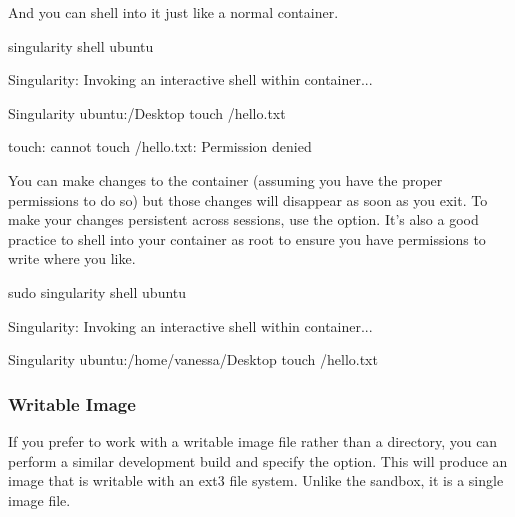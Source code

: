 \documentclass[letterpaper,10pt,english]{sphinxmanual}
\begin{document}
And you can shell into it just like a normal container.

%
\begin{sphinxVerbatim}[commandchars=\\\{\}]
\PYGZdl{} singularity shell ubuntu

Singularity: Invoking an interactive shell within container...


Singularity ubuntu:\PYGZti{}/Desktop\PYGZgt{} touch /hello.txt

touch: cannot touch \PYGZsq{}/hello.txt\PYGZsq{}: Permission denied
\end{sphinxVerbatim}

You can make changes to the container (assuming you have the proper
permissions to do so) but those changes will disappear as soon as you
exit. To make your changes persistent across sessions, use the  option.
It’s also a good practice to shell into your container as root to
ensure you have permissions to write where you like.

%
\begin{sphinxVerbatim}[commandchars=\\\{\}]
\PYGZdl{} sudo singularity shell ubuntu

Singularity: Invoking an interactive shell within container...


Singularity ubuntu:/home/vanessa/Desktop\PYGZgt{} touch /hello.txt
\end{sphinxVerbatim}


\subsubsection{Writable Image}
\label{\detokenize{singularity_flow:writable-image}}
If you prefer to work with a writable image file rather than a
directory, you can perform a similar development build and specify the 
option. This will produce an image that is writable with an ext3 file
system. Unlike the sandbox, it is a single image file.
\end{document}
